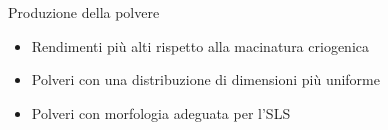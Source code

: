 \documentclass[15pt, aspectratio=169]{beamer}
\begin{document}
    \begin{frame}{Produzione della polvere}


        \begin{itemize}
          \item <4-6> Rendimenti più alti rispetto alla macinatura criogenica
          \item <5-6> Polveri con una distribuzione di dimensioni più uniforme
          \item <6> Polveri con morfologia adeguata per l'SLS
        \end{itemize}
        
      \end{frame}
\end{document}
